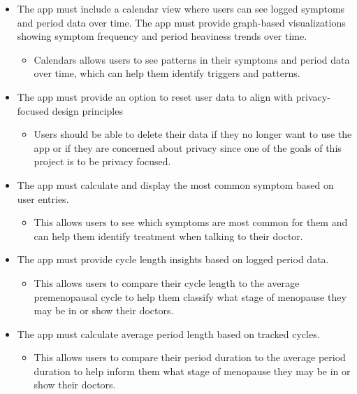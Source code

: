 \begin{itemize}
\begin{itemize}
        \end{itemize}
      \item The app must include a calendar view where users can see logged symptoms and period data over time. The app must provide graph-based visualizations showing symptom frequency and period heaviness trends over time.
        \begin{itemize}
          \item Calendars allows users to see patterns in their symptoms and period data over time, which can help them identify triggers and patterns\cite{Brambilla1994}.
        \end{itemize}
      \item The app must provide an option to reset user data to align with privacy-focused design principles
        \begin{itemize}
          \item Users should be able to delete their data if they no longer want to use the app or if they are concerned about privacy since one of the goals of this project is to be privacy focused.
        \end{itemize}
      \item The app must calculate and display the most common symptom based on user entries.
        \begin{itemize}
          \item This allows users to see which symptoms are most common for them and can help them identify treatment when talking to their doctor\cite{Brambilla1994}.
        \end{itemize}
      \item The app must provide cycle length insights based on logged period data.
        \begin{itemize}
          \item This allows users to compare their cycle length to the average premenopausal cycle to help them classify what stage of menopause they may be in or show their doctors\cite{Brambilla1994}.
        \end{itemize}
      \item The app must calculate average period length based on tracked cycles.
        \begin{itemize}
          \item This allows users to compare their period duration to the average period duration to help inform them what stage of menopause they may be in or show their doctors\cite{Brambilla1994}.
        \end{itemize}

\end{itemize}
